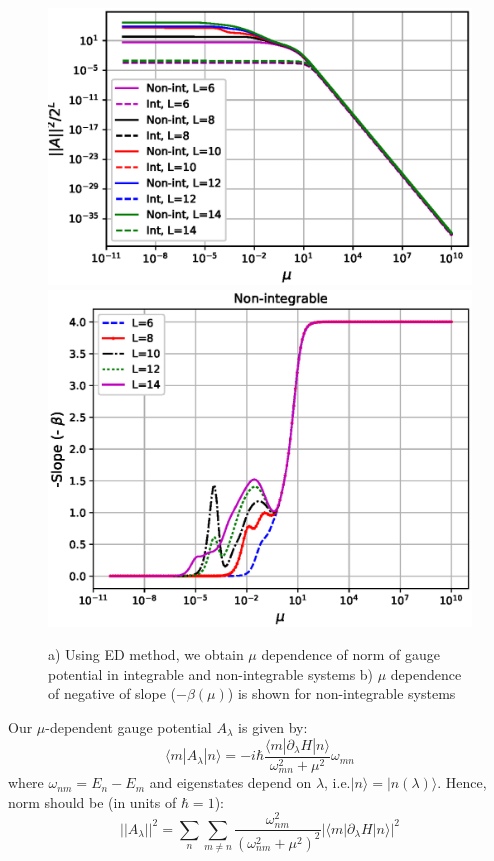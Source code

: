 \documentclass[11pt,a4paper]{article}
\begin{document}
\begin{figure}[!ht]
\begin{center}
\includegraphics[scale=0.51]{new_pics/v2_norm_mu_scaling.eps} 
\includegraphics[scale=0.43]{new_pics/v3_slope_nonint_semilogx.eps}
\caption{a) Using ED method, we obtain  $\mu$ dependence of norm of gauge potential in integrable and non-integrable systems b) $\mu$ dependence of negative of slope ($-\beta (\mu)$) is shown for non-integrable systems}
\label{mu_scaling}
\end{center}
\end{figure}


Our $\mu$-dependent gauge potential $A_{\lambda}$ is given by:
\begin{equation}
\langle m |A_{\lambda} | n \rangle =  -i \hbar \dfrac{\langle m |\partial_{\lambda}H | n \rangle}{\omega_{mn}^2+ \mu^2} \omega_{mn}
\end{equation}
where $\omega_{nm}=E_n-E_m$ and eigenstates depend on $\lambda$, i.e.$|n \rangle= |n (\lambda) \rangle $. Hence, norm should be (in units of $\hbar=1$):
\begin{equation}
||A_{\lambda}||^2 = \sum_n \sum_{m \neq n}  \dfrac{\omega_{nm}^2}{(\omega_{nm}^2 + \mu^2)^2} |\langle m | \partial_{\lambda}H| n \rangle|^2
\end{equation}
\end{document}
